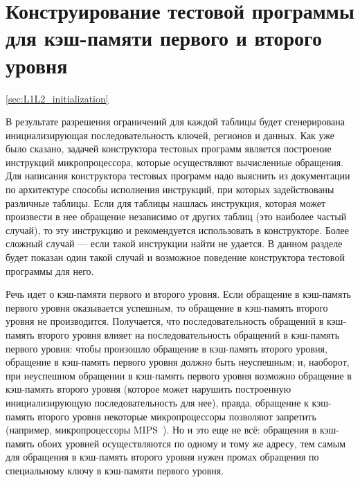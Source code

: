 

\section{Конструирование тестовой программы для кэш-памяти первого и второго
уровня}\ref{sec:L1L2_initialization}

В результате разрешения ограничений для каждой таблицы будет сгенерирована инициализирующая последовательность ключей, регионов и данных. Как уже было сказано, задачей
конструктора тестовых программ является построение инструкций микропроцессора,
которые осуществляют вычисленные обращения. Для написания конструктора тестовых
программ надо выяснить из документации по архитектуре способы исполнения
инструкций, при которых задействованы различные таблицы. Если для таблицы
нашлась инструкция, которая может произвести в нее обращение независимо от
других таблиц (это наиболее частый случай), то эту инструкцию и рекомендуется использовать в конструкторе. Более сложный
случай --- если такой инструкции найти не удается. В данном разделе будет
показан один такой случай и возможное поведение конструктора тестовой программы
для него.

Речь идет о кэш-памяти первого и второго уровня. Если обращение в кэш-память
первого уровня оказывается успешным, то обращение в кэш-память
второго уровня не производится. Получается, что последовательность обращений в
кэш-память второго уровня влияет на последовательность обращений в кэш-память
первого уровня: чтобы произошло обращение в кэш-память второго уровня, обращение
в кэш-память первого уровня должно быть неуспешным; и, наоборот, при неуспешном
обращении в кэш-память первого уровня возможно обращение в кэш-память второго
уровня (которое может нарушить построенную инициализирующую последовательность
для нее), правда, обращение к кэш-память второго уровня некоторые
микропроцессоры позволяют запретить (например, микропроцессоры
MIPS~\cite{mips64III}). Но и это еще не всё: обращения в кэш-память обоих
уровней осуществляются по одному и тому же адресу, тем самым для обращения в
кэш-память второго уровня нужен промах обращения по специальному ключу в
кэш-памяти первого уровня.

